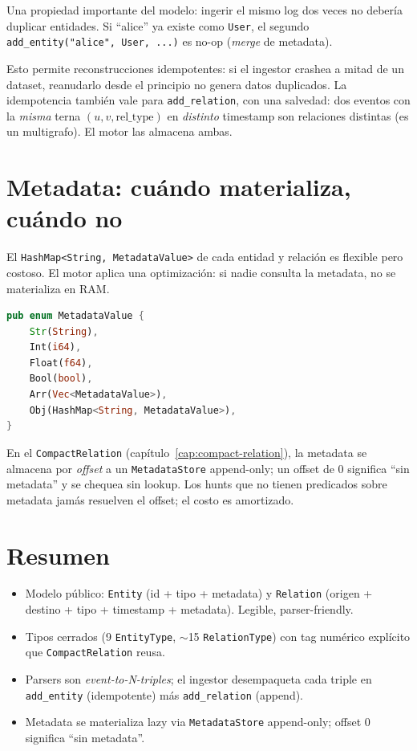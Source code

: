 Una propiedad importante del modelo: ingerir el mismo log dos veces
no debería duplicar entidades. Si ``alice'' ya existe como
\texttt{User}, el segundo \texttt{add\_entity("alice", User, ...)}
es no-op (\emph{merge} de metadata).

Esto permite reconstrucciones idempotentes: si el ingestor crashea a
mitad de un dataset, reanudarlo desde el principio no genera datos
duplicados. La idempotencia también vale para \texttt{add\_relation},
con una salvedad: dos eventos con la \emph{misma} terna
\((u, v, \text{rel\_type})\) en \emph{distinto} timestamp son
relaciones distintas (es un multigrafo). El motor las almacena ambas.

\section{Metadata: cuándo materializa, cuándo no}

El \texttt{HashMap<String, MetadataValue>} de cada entidad y
relación es flexible pero costoso. El motor aplica una optimización:
si nadie consulta la metadata, no se materializa en RAM.

\begin{lstlisting}[language=Rust]
pub enum MetadataValue {
    Str(String),
    Int(i64),
    Float(f64),
    Bool(bool),
    Arr(Vec<MetadataValue>),
    Obj(HashMap<String, MetadataValue>),
}
\end{lstlisting}

En el \texttt{CompactRelation} (capítulo~\ref{cap:compact-relation}),
la metadata se almacena por \emph{offset} a un
\texttt{MetadataStore} append-only; un offset de 0 significa ``sin
metadata'' y se chequea sin lookup. Los hunts que no tienen
predicados sobre metadata jamás resuelven el offset; el costo es
amortizado.

\section{Resumen}

\begin{itemize}
    \item Modelo público: \texttt{Entity} (id + tipo + metadata) y
    \texttt{Relation} (origen + destino + tipo + timestamp +
    metadata). Legible, parser-friendly.
    \item Tipos cerrados (9 \texttt{EntityType}, $\sim$15
    \texttt{RelationType}) con tag numérico explícito que
    \texttt{CompactRelation} reusa.
    \item Parsers son \emph{event-to-N-triples}; el ingestor
    desempaqueta cada triple en \texttt{add\_entity} (idempotente)
    más \texttt{add\_relation} (append).
    \item Metadata se materializa lazy via \texttt{MetadataStore}
    append-only; offset 0 significa ``sin metadata''.
\end{itemize}

